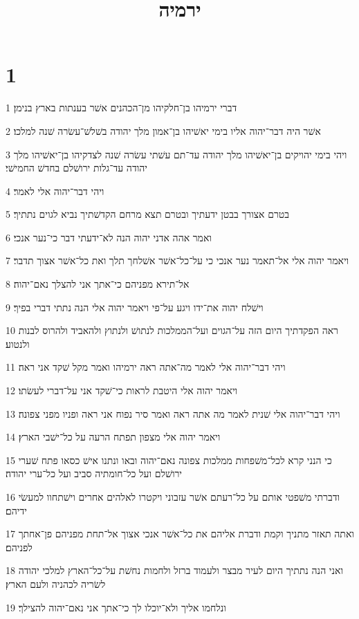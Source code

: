 

\title{ירמיה}


\chapter{1}

\par 1 דברי ירמיהו בן־חלקיהו מן־הכהנים אשׁר בענתות בארץ בנימן׃
\par 2 אשׁר היה דבר־יהוה אליו בימי יאשׁיהו בן־אמון מלך יהודה בשׁלשׁ־עשׂרה שׁנה למלכו׃
\par 3 ויהי בימי יהויקים בן־יאשׁיהו מלך יהודה עד־תם עשׁתי עשׂרה שׁנה לצדקיהו בן־יאשׁיהו מלך יהודה עד־גלות ירושׁלם בחדשׁ החמישׁי׃
\par 4 ויהי דבר־יהוה אלי לאמר׃
\par 5 בטרם אצורך בבטן ידעתיך ובטרם תצא מרחם הקדשׁתיך נביא לגוים נתתיך׃
\par 6 ואמר אהה אדני יהוה הנה לא־ידעתי דבר כי־נער אנכי׃
\par 7 ויאמר יהוה אלי אל־תאמר נער אנכי כי על־כל־אשׁר אשׁלחך תלך ואת כל־אשׁר אצוך תדבר׃
\par 8 אל־תירא מפניהם כי־אתך אני להצלך נאם־יהוה׃
\par 9 וישׁלח יהוה את־ידו ויגע על־פי ויאמר יהוה אלי הנה נתתי דברי בפיך׃
\par 10 ראה הפקדתיך היום הזה על־הגוים ועל־הממלכות לנתושׁ ולנתוץ ולהאביד ולהרוס לבנות ולנטוע׃
\par 11 ויהי דבר־יהוה אלי לאמר מה־אתה ראה ירמיהו ואמר מקל שׁקד אני ראה׃
\par 12 ויאמר יהוה אלי היטבת לראות כי־שׁקד אני על־דברי לעשׂתו׃
\par 13 ויהי דבר־יהוה אלי שׁנית לאמר מה אתה ראה ואמר סיר נפוח אני ראה ופניו מפני צפונה׃
\par 14 ויאמר יהוה אלי מצפון תפתח הרעה על כל־ישׁבי הארץ׃
\par 15 כי הנני קרא לכל־משׁפחות ממלכות צפונה נאם־יהוה ובאו ונתנו אישׁ כסאו פתח שׁערי ירושׁלם ועל כל־חומתיה סביב ועל כל־ערי יהודה׃
\par 16 ודברתי משׁפטי אותם על כל־רעתם אשׁר עזבוני ויקטרו לאלהים אחרים וישׁתחוו למעשׂי ידיהם׃
\par 17 ואתה תאזר מתניך וקמת ודברת אליהם את כל־אשׁר אנכי אצוך אל־תחת מפניהם פן־אחתך לפניהם׃
\par 18 ואני הנה נתתיך היום לעיר מבצר ולעמוד ברזל ולחמות נחשׁת על־כל־הארץ למלכי יהודה לשׂריה לכהניה ולעם הארץ׃
\par 19 ונלחמו אליך ולא־יוכלו לך כי־אתך אני נאם־יהוה להצילך׃


